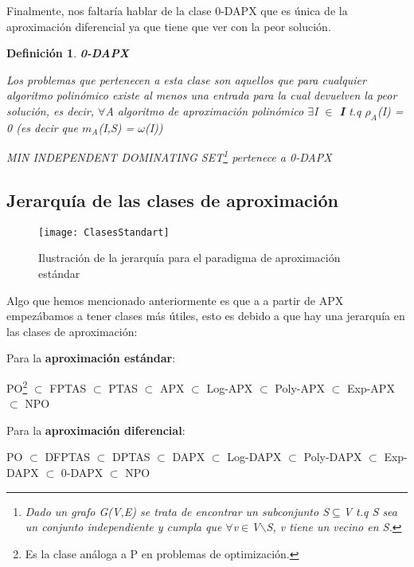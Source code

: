 \documentclass[a4paper,12pt,titlepage]{article}
\newtheorem{defi}{Definici\'on}[section]
\begin{document}
Finalmente, nos faltar\'ia hablar de la clase 0-DAPX que es \'unica de la aproximaci\'on diferencial ya que tiene que ver con la peor soluci\'on.

\begin{defi}

\textbf{0-DAPX}

Los problemas que pertenecen a esta clase son aquellos que para cualquier algoritmo polin\'omico existe al menos una entrada para la cual devuelven la peor soluci\'on, es decir, $\forall$A algoritmo de aproximaci\'on polin\'omico $\exists$I $\in$ \textbf{I} t.q $\rho_{A}$(I) = 0 (es decir que $m_A$(I,S) = $\omega$(I))

MIN INDEPENDENT DOMINATING SET\footnote{Dado un grafo G(V,E) se trata de encontrar un subconjunto S$\subseteq$V t.q S sea un conjunto independiente y cumpla que $\forall$v$\in$V$\backslash$S, v tiene un vecino en S.} pertenece a 0-DAPX

\end{defi}

\subsection{Jerarqu\'ia de las clases de aproximaci\'on}

\begin{figure}[h]
\centering
\texttt{[image: ClasesStandart]}
\caption{Ilustraci\'on de la jerarqu\'ia para el paradigma de aproximaci\'on est\'andar}
\end{figure}

Algo que hemos mencionado anteriormente es que a a partir de APX empez\'abamos a tener clases m\'as \'utiles, esto es debido a que hay una jerarqu\'ia en las clases de aproximaci\'on:

\vspace{\baselineskip}

Para la \textbf{aproximaci\'on est\'andar}:

PO\footnote{Es la clase an\'aloga a P en problemas de optimizaci\'on.}  $\subset$ FPTAS $\subset$ PTAS $\subset$ APX $\subset$ Log-APX $\subset$ Poly-APX $\subset$ Exp-APX $\subset$ NPO

\vspace{\baselineskip}

Para la \textbf{aproximaci\'on diferencial}:

PO $\subset$ DFPTAS $\subset$ DPTAS $\subset$ DAPX $\subset$ Log-DAPX $\subset$ Poly-DAPX $\subset$ Exp-DAPX $\subset$ 0-DAPX $\subset$ NPO
\end{document}
